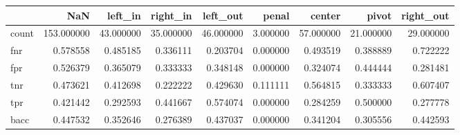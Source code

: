 \begin{tabular}{lrrrrrrrr}
\toprule
{} &         NaN &    left\_in &   right\_in &   left\_out &     penal &     center &      pivot &  right\_out \\
\midrule
count &  153.000000 &  43.000000 &  35.000000 &  46.000000 &  3.000000 &  57.000000 &  21.000000 &  29.000000 \\
fnr   &    0.578558 &   0.485185 &   0.336111 &   0.203704 &  0.000000 &   0.493519 &   0.388889 &   0.722222 \\
fpr   &    0.526379 &   0.365079 &   0.333333 &   0.348148 &  0.000000 &   0.324074 &   0.444444 &   0.281481 \\
tnr   &    0.473621 &   0.412698 &   0.222222 &   0.429630 &  0.111111 &   0.564815 &   0.333333 &   0.607407 \\
tpr   &    0.421442 &   0.292593 &   0.441667 &   0.574074 &  0.000000 &   0.284259 &   0.500000 &   0.277778 \\
bacc  &    0.447532 &   0.352646 &   0.276389 &   0.437037 &  0.000000 &   0.341204 &   0.305556 &   0.442593 \\
\bottomrule
\end{tabular}
